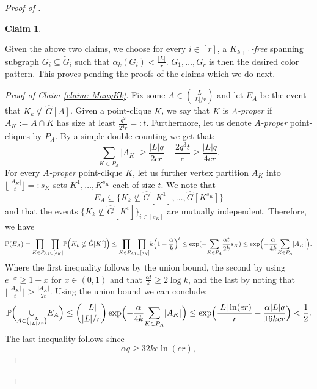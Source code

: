\documentclass[12pt]{article}
\newcommand{\red}[1]{\textcolor{red}{#1}}
\newtheorem{claim}[subsection]{Claim}
\theoremstyle{definition}
\begin{document}
\begin{proof}[Proof of ]
\begin{claim}
		\end{claim}
		Given the above two claims, we choose for every $i \in [r]$, a $K_{k+1}$\textit{-free} spanning subgraph $G_i \subseteq \tilde{G}_i$ such that $\alpha_k(G_i)<\frac{|L|}{r}$. $G_1,\dots,G_r$ is then the desired color pattern. This proves  pending the proofs of the claims which we do next.
		
		
		\begin{proof}[Proof of Claim \ref{claim: ManyKk}]
			Fix some $A \in \binom{L}{|L|/r}$ and let $E_A$ be the event that $K_k \nsubseteq\hat{G}[A]$. Given a point-clique $K$, we say that $K$ is $A$\textit{-proper} if 
			$A_K:= A\cap K$ has size at least $\frac{q^2}{2^4r}=:t$. Furthermore, let us denote $A$\textit{-proper} point-cliques by $P_A$. By a simple double counting we get that:
			\begin{equation}
				\underset{K \in P_A}{\sum}|A_K| \geq \frac{|L|q}{2cr}- \frac{2q^3 t}{c}\geq \frac{|L|q}{4cr}.
			\end{equation}
			For every $A$\textit{-proper} point-clique $K$, let us further vertex partition $A_K$ into $\lfloor \frac{|A_K|}{t}\rfloor=:s_K$ sets $K^1,\dots,K^{s_K}$ each of size $t$. We note that 
			\[E_A\subseteq\{K_k \nsubseteq \hat{G}[K^1],\dots,\hat{G}[K^{s_K}]\} \]
			and that the events $\{K_k\nsubseteq \hat{G}[K^i]\}_{i \in [s_K]}$ are mutually independent. Therefore, we have
			\begin{equation*}
				\mathbb{P}( E_A) = \underset{K \in P_A}{\prod}\underset{j \in [s_K]}{\prod}\mathbb{P}\Bigl(K_k\nsubseteq\hat{G}[K^j]\Bigr) \leq  \underset{K \in P_A}{\prod}\underset{j \in [s_K]}{\prod}k\Bigl(1-\frac{\alpha}{k}\Bigr)^t \leq \exp(-\underset{K \in P_A}\sum\frac{\alpha t}{2k} s_K) \leq \exp\Bigl(-\frac{\alpha }{4k}\underset{K \in P_A}\sum|A_K|\Bigr).
			\end{equation*}
			Where the first inequality follows by the union bound, the second by using $e^{-x}\geq 1-x$ for $x \in (0,1)$ and that $\frac{\alpha t}{k}\geq 2 \log k$, and the last by noting that $\lfloor \frac{|A_K|}{t}\rfloor \geq \frac{|A_K|}{2t}$.
			Using the union bound we can conclude:
			\begin{equation*}
				\mathbb{P}\Bigl( \underset{A \in \binom{L}{|L|/r}}{ \cup}E_A\Bigr)\leq \binom{|L|}{|L|/r} \exp \Bigl( -\frac{\alpha}{4k} \underset{K \in P_A}{\sum}|A_K| \Bigr) \leq \exp \Bigl( \frac{|L| \ln (er)}{r}-\frac{\alpha |L|q}{16kcr}\Bigr) < \frac{1}{2}.
			\end{equation*}
			The last inequality follows since 
            \begin{equation}\label{eq: techKk}
                \alpha q \geq 32kc\ln(er),
            \end{equation}
            

\end{proof}
\end{proof}
\end{document}
